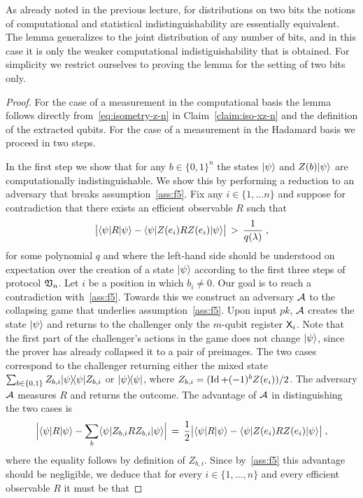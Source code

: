 As already noted in the previous lecture, for distributions on two bits the notions of computational and statistical indistinguishability are essentially equivalent. The lemma generalizes to the joint distribution of any number of bits, and in this case it is only the weaker computational indistiguishability that is obtained. For simplicity we restrict ourselves to proving the lemma for the setting of two bits only. 

\begin{proof}
For the case of a measurement in the computational basis the lemma follows directly from~\eqref{eq:isometry-z-n} in Claim~\ref{claim:iso-xz-n} and the definition of the extracted qubits. 
For the case of a measurement in the Hadamard basis we proceed in two steps. 

In the first step we show that for any $b\in\{0,1\}^n$ the states $|\psi\rangle$ and $Z(b)|\psi\rangle$ are computationally indistinguishable. We show this by performing a reduction to an adversary that breaks assumption~\ref{ass:f5}. Fix any $i\in\{1,\ldots n\}$ and suppose for contradiction that there exists an efficient observable $R$ such that 
\[ \big|\langle\psi| R |\psi\rangle -  \langle\psi| Z(e_i) R Z(e_i) |\psi\rangle \big| \,>\, \frac{1}{q(\lambda)}\;,\]
for some polynomial $q$ and where the left-hand side should be understood on expectation over the creation of a state $|\psi\rangle$ according to the first three steps of protocol $\mathfrak{V}_n$. Let $i$ be a position in which $b_i\neq 0$. Our goal is to reach a contradiction with~\ref{ass:f5}. Towards this we construct an adversary $\mathcal{A}$ to the collapsing game that underlies assumption~\ref{ass:f5}. Upon input $pk$, $\mathcal{A}$ creates the state $|\psi\rangle$ and returns to the challenger only the $m$-qubit register ${\textsf{X}}_i$. Note that the first part of the challenger's actions in the game does not change $|\psi\rangle$, since the prover has already collapsed it to a pair of preimages. The two cases correspond to the challenger returning either the mixed state $\sum_{b\in\{0,1\}} Z_{b,i} |\psi\rangle\!\langle\psi| Z_{b,i}$ or $|\psi\rangle\!\langle\psi|$, where $Z_{b,i}= (\mathop{\rm Id}\nolimits + (-1)^{b} Z(e_i))/2$. The adversary $\mathcal{A}$ measures $R$ and returns the outcome. The advantage of $\mathcal{A}$ in distinguishing the two cases is 
\[ \Big| \langle\psi| R |\psi\rangle - \sum_b  \langle\psi| Z_{b,i} R Z_{b,i} |\psi\rangle\Big| \,=\, \frac{1}{2}\big|  \langle\psi| R |\psi\rangle - \langle\psi| Z(e_i) R Z(e_i)|\psi\rangle\big|\;,\]
where the equality follows by definition of $Z_{b,i}$. 
Since by~\ref{ass:f5} this advantage should be negligible, we deduce that for every $i\in\{1,\ldots,n\}$ and every efficient observable $R$ it must be that 

\end{proof}
